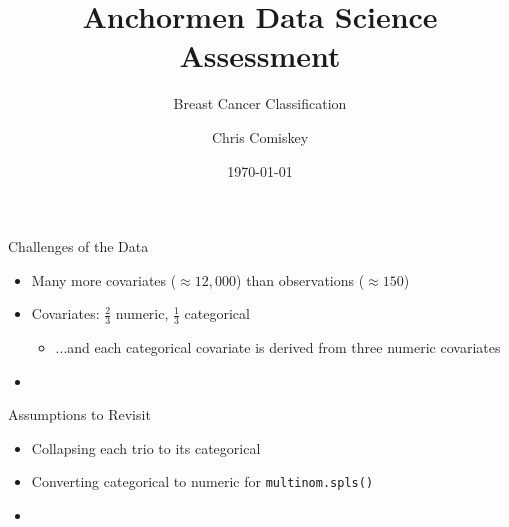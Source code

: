 \documentclass{beamer}
\institute{}
\title{Anchormen Data Science Assessment}
\subtitle{Breast Cancer Classification}
\author{Chris Comiskey}
\date{\today}
\begin{document}
\begin{frame}
  \titlepage
\end{frame}



\begin{frame}{Challenges of the Data}{}

  \begin{itemize}
  \addtolength{\itemsep}{0.5\baselineskip}
  \item Many more covariates ($\approx 12,000$) than observations ($\approx 150$)
  \item Covariates: $\frac{2}{3}$ numeric, $\frac{1}{3}$ categorical
      \begin{itemize}
      \item ...and each categorical covariate is derived from three numeric covariates
      \end{itemize}
  \item 
  \end{itemize}
\end{frame}

\begin{frame}{Assumptions to Revisit}{}

  \begin{itemize}
  \addtolength{\itemsep}{0.5\baselineskip}
  \item Collapsing each trio to its categorical 
  \item Converting categorical to numeric for \verb|multinom.spls()|

  \item 
  \end{itemize}
\end{frame}
\end{document}
